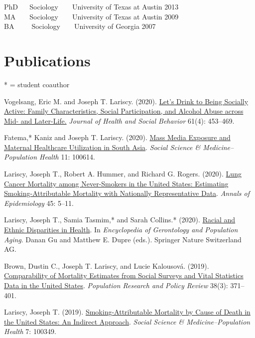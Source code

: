 \documentclass[11pt,]{article}
\begin{document}
PhD ~ ~Sociology ~ ~ University of Texas at Austin \hfill 2013\\
MA ~ ~ Sociology ~ ~ University of Texas at Austin \hfill 2009\\
BA ~ ~ ~Sociology ~ ~ University of Georgia \hfill 2007

\hypertarget{publications}{%
\section{Publications}\label{publications}}

* = student coauthor

Vogelsang, Eric M. and Joseph T. Lariscy. (2020).
\href{https://journals.sagepub.com/doi/full/10.1177/0022146520962456}{Let's
Drink to Being Socially Active: Family Characteristics, Social
Participation, and Alcohol Abuse across Mid- and Later-Life.}
\emph{Journal of Health and Social Behavior} 61(4): 453--469.

Fatema,* Kaniz and Joseph T. Lariscy. (2020).
\href{https://www.sciencedirect.com/science/article/pii/S2352827320302512}{Mass
Media Exposure and Maternal Healthcare Utilization in South Asia}.
\emph{Social Science \& Medicine--Population Health} 11: 100614.

Lariscy, Joseph T., Robert A. Hummer, and Richard G. Rogers. (2020).
\href{https://www.sciencedirect.com/science/article/pii/S1047279720301393}{Lung
Cancer Mortality among Never-Smokers in the United States: Estimating
Smoking-Attributable Mortality with Nationally Representative Data}.
\emph{Annals of Epidemiology} 45: 5--11.

Lariscy, Joseph T., Samia Tasmim,* and Sarah Collins.* (2020).
\href{https://link.springer.com/referenceworkentry/10.1007/978-3-319-69892-2_999-1}{Racial
and Ethnic Disparities in Health}. In \emph{Encyclopedia of Gerontology
and Population Aging}. Danan Gu and Matthew E. Dupre (eds.). Springer
Nature Switzerland AG.

Brown, Dustin C., Joseph T. Lariscy, and Lucie Kalousová. (2019).
\href{https://link.springer.com/article/10.1007/s11113-018-9505-1}{Comparability
of Mortality Estimates from Social Surveys and Vital Statistics Data in
the United States}. \emph{Population Research and Policy Review} 38(3):
371--401.

Lariscy, Joseph T. (2019).
\href{https://www.sciencedirect.com/science/article/pii/S2352827318302118?via\%3Dihub}{Smoking-Attributable
Mortality by Cause of Death in the United States: An Indirect Approach}.
\emph{Social Science \& Medicine--Population Health} 7: 100349.
\end{document}
